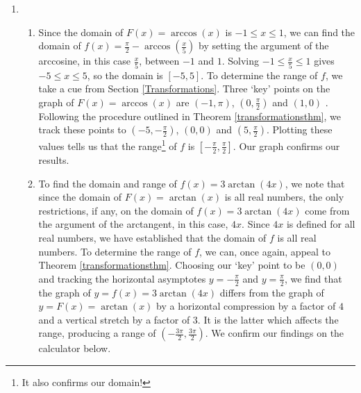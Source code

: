 \documentclass[12pt]{ximera}
\begin{document}
\begin{example}
\begin{enumerate}
\begin{enumerate}
\begin{tabular}{m{2.5in}m{1in}m{2.5in}}
& 

&

 \\ 

\end{tabular}

\end{enumerate}



\item \begin{enumerate}

\item  Since the domain of $F(x) = \arccos(x)$ is $-1 \leq x \leq 1$, we can find the domain of $f(x) = \frac{\pi}{2} - \arccos\left(\frac{x}{5}\right)$ by setting the argument of the arccosine, in this case $\frac{x}{5}$, between $-1$ and $1$. Solving  $-1 \leq \frac{x}{5} \leq 1$ gives $-5 \leq x \leq 5$, so the domain is $[-5,5]$.  To determine the range of $f$, we take a cue from Section \ref{Transformations}. Three `key' points on the graph of $F(x) = \arccos(x)$ are  $(-1, \pi)$, $\left(0, \frac{\pi}{2}\right)$ and $(1,0)$ . Following the procedure outlined in Theorem \ref{transformationsthm}, we track these points to $\left(-5, -\frac{\pi}{2}\right)$, $(0, 0)$ and $\left(5, \frac{\pi}{2}\right)$. Plotting these values tells us that the range\footnote{It also confirms our domain!} of $f$ is $\left[-\frac{\pi}{2}, \frac{\pi}{2}\right]$. Our graph confirms our results.


\item  To find the domain and range of $f(x) = 3\arctan\left(4x \right)$, we note that since the domain of $F(x) = \arctan(x)$ is all real numbers, the only restrictions, if any, on the domain of  $f(x) = 3\arctan\left(4x \right)$ come from the argument of the arctangent, in this case, $4x$.  Since $4x$ is defined for all real numbers, we have established that the domain of $f$ is all real numbers.  To determine the range of $f$, we can, once again, appeal to Theorem \ref{transformationsthm}.  Choosing our `key' point to be $(0,0)$ and tracking the horizontal asymptotes $y = -\frac{\pi}{2}$ and $y= \frac{\pi}{2}$, we find that the graph of $y = f(x) = 3\arctan\left(4x \right)$ differs from the graph of $y = F(x) = \arctan(x)$ by a horizontal compression by a factor of $4$ and a vertical stretch by a factor of $3$.  It is the latter which affects the range, producing a range of $\left(-\frac{3\pi}{2}, \frac{3\pi}{2} \right)$.  We confirm our findings on the calculator below.


\end{enumerate}
\end{enumerate}
\end{example}
\end{document}

